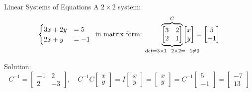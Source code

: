 \documentclass[8pt,dvipsnames]{beamer}
\begin{document}
\begin{frame}{Linear Systems of Equations}
A $2\times 2$ system:
    $$
    \begin{cases} 
      3x + 2y &=5\\
      2x + y &=-1
    \end{cases}\,\text{ in matrix form: }
    \udesc{\det=3\times1 -2\times2 = -1\not=0}{\odesc{C}{
    \begin{bmatrix}
      3 & 2\\ 2 & 1
    \end{bmatrix}}}\!\!\!\!\!\!\!\!\!\!\!\!\!\!\!
    \begin{bmatrix}
      x \\ y
    \end{bmatrix}=
    \begin{bmatrix}
      5 \\ -1
    \end{bmatrix}
    $$\medskip
    
  Solution:
    $$
    C^{-1} =
    \begin{bmatrix}
      -1 & 2\\2 & -3
    \end{bmatrix},\quad
    C^{-1}C
    \begin{bmatrix}
      x\\y  
    \end{bmatrix} = 
    I
    \begin{bmatrix}
      x\\y
    \end{bmatrix}
    =
    \begin{bmatrix}
      x \\ y
    \end{bmatrix}
    =
    C^{-1}
    \begin{bmatrix}
      5\\-1
    \end{bmatrix} =
    \begin{bmatrix}
      -7\\13
    \end{bmatrix}
    $$\medskip
    \end{frame}
    
\end{document}

